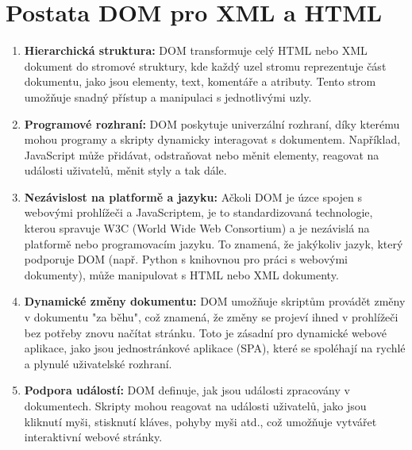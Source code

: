 \chapter{Postata DOM pro XML a HTML}
\label{cha:PostataDom}

\begin{enumerate}
\item \textbf{Hierarchická struktura:} DOM transformuje celý HTML nebo XML dokument do stromové struktury, kde každý uzel stromu reprezentuje část dokumentu, jako jsou elementy, text, komentáře a atributy. Tento strom umožňuje snadný přístup a manipulaci s jednotlivými uzly.

\item \textbf{Programové rozhraní:} DOM poskytuje univerzální rozhraní, díky kterému mohou programy a skripty dynamicky interagovat s dokumentem. Například, JavaScript může přidávat, odstraňovat nebo měnit elementy, reagovat na události uživatelů, měnit styly a tak dále.

\item \textbf{Nezávislost na platformě a jazyku:} Ačkoli DOM je úzce spojen s webovými prohlížeči a JavaScriptem, je to standardizovaná technologie, kterou spravuje W3C (World Wide Web Consortium) a je nezávislá na platformě nebo programovacím jazyku. To znamená, že jakýkoliv jazyk, který podporuje DOM (např. Python s knihovnou pro práci s webovými dokumenty), může manipulovat s HTML nebo XML dokumenty.

\item \textbf{Dynamické změny dokumentu:} DOM umožňuje skriptům provádět změny v dokumentu "za běhu", což znamená, že změny se projeví ihned v prohlížeči bez potřeby znovu načítat stránku. Toto je zásadní pro dynamické webové aplikace, jako jsou jednostránkové aplikace (SPA), které se spoléhají na rychlé a plynulé uživatelské rozhraní.

\item \textbf{Podpora událostí:} DOM definuje, jak jsou události zpracovány v dokumentech. Skripty mohou reagovat na události uživatelů, jako jsou kliknutí myši, stisknutí kláves, pohyby myši atd., což umožňuje vytvářet interaktivní webové stránky.
\end{enumerate}
